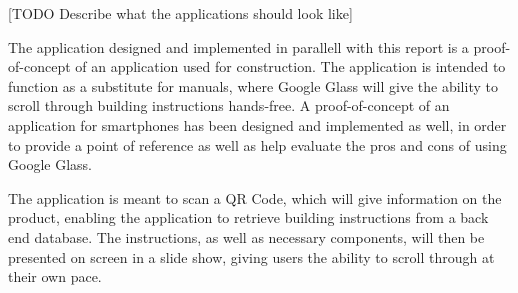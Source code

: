 [TODO Describe what the applications should look like]

The application designed and implemented in parallell with this report is a proof-of-concept of an application used for construction. The application is intended to function as a substitute for manuals, where Google Glass will give the ability to scroll through building instructions hands-free. A proof-of-concept of an application for smartphones has been designed and implemented as well, in order to provide a point of reference as well as help evaluate the pros and cons of using Google Glass.

The application is meant to scan a QR Code, which will give information on the product, enabling the application to retrieve building instructions from a back end database. The instructions, as well as necessary components, will then be presented on screen in a slide show, giving users the ability to scroll through at their own pace.